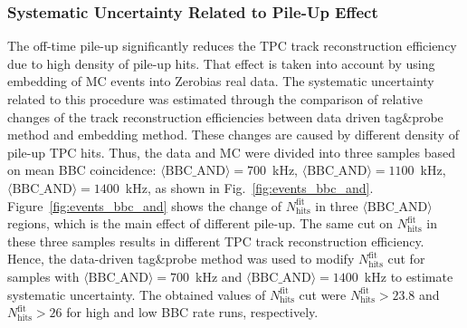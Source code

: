 \subsubsection{Systematic Uncertainty Related to Pile-Up Effect}
The off-time pile-up significantly reduces the TPC track reconstruction efficiency due to high density of pile-up hits. That effect is taken into account by using embedding of MC events into Zerobias real data. The systematic uncertainty related to this procedure was estimated through the comparison of relative changes of the track reconstruction efficiencies between data driven tag\&probe method\cite{RafalThesis} and embedding method. These changes are caused by different density of pile-up TPC hits. Thus, the data and MC  were divided into three samples based on mean BBC coincidence: $\langle \textrm{BBC\_AND}\rangle=700$~kHz, $\langle \textrm{BBC\_AND}\rangle=1100$~kHz, $\langle \textrm{BBC\_AND}\rangle=1400$~kHz, as shown in Fig.~\ref{fig:events_bbc_and}.  Figure~\ref{fig:events_bbc_and} shows the change of $N_\textrm{hits}^\textrm{fit}$ in three $\langle\textrm{BBC\_AND}\rangle$ regions, which is the main effect of different pile-up.
The same cut on $N_\textrm{hits}^\textrm{fit}$ in these three samples results in different TPC track reconstruction efficiency. Hence, the data-driven tag\&probe method was used to modify $N_\textrm{hits}^\textrm{fit}$ cut for samples with $\langle \textrm{BBC\_AND}\rangle=700$~kHz and $\langle \textrm{BBC\_AND}\rangle=1400$~kHz to estimate systematic uncertainty. The obtained values of $N_\textrm{hits}^\textrm{fit}$ cut were $N_\textrm{hits}^\textrm{fit} > 23.8$ and $N_\textrm{hits}^\textrm{fit} > 26$ for high and low BBC rate runs, respectively.
 

